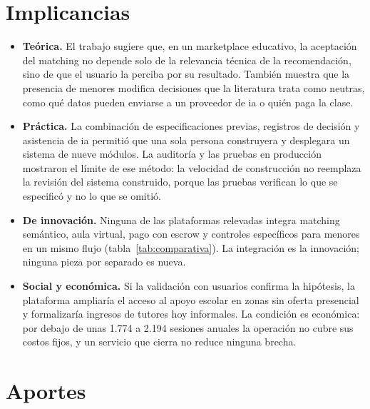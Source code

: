 \section{Implicancias}\label{sec:implicancias}

\begin{itemize}
    \item \textbf{Teórica.} El trabajo sugiere que, en un
          \gls{marketplace} educativo, la aceptación del \gls{matching} no
          depende solo de la relevancia técnica de la recomendación, sino
          de que el usuario la perciba por su resultado. También muestra
          que la presencia de menores modifica decisiones que la
          literatura trata como neutras, como qué datos pueden enviarse a
          un proveedor de \gls{ia} o quién paga la clase.
    \item \textbf{Práctica.} La combinación de especificaciones previas,
          registros de decisión y asistencia de \gls{ia} permitió que una
          sola persona construyera y desplegara un sistema de nueve
          módulos. La auditoría y las pruebas en producción mostraron el
          límite de ese método: la velocidad de construcción no reemplaza
          la revisión del sistema construido, porque las pruebas verifican lo que
          se especificó y no lo que se omitió.
    \item \textbf{De innovación.} Ninguna de las plataformas relevadas
          integra \gls{matching} semántico, aula virtual, pago con
          \gls{escrow} y controles específicos para menores en un mismo
          flujo (tabla~\ref{tab:comparativa}). La integración es la
          innovación; ninguna pieza por separado es nueva.
    \item \textbf{Social y económica.} Si la validación con usuarios
          confirma la hipótesis,
          la plataforma ampliaría el acceso al apoyo escolar en zonas sin
          oferta presencial y formalizaría ingresos de tutores hoy
          informales. La condición es económica: por debajo de unas 1.774 a
          2.194 sesiones anuales la operación no cubre sus costos fijos, y
          un servicio que cierra no reduce ninguna brecha.
\end{itemize}

\section{Aportes}\label{sec:aportes}

